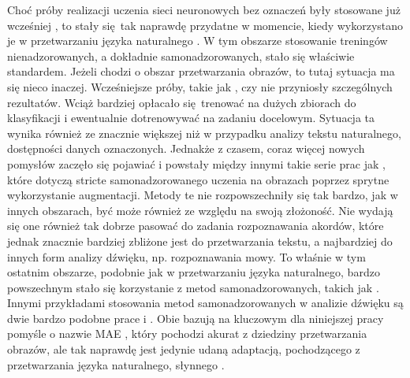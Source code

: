 Choć próby realizacji uczenia sieci neuronowych bez oznaczeń były stosowane już wcześniej \cite{noroozi_unsupervised_2017}, to stały się tak naprawdę przydatne w momencie, kiedy wykorzystano je w przetwarzaniu języka naturalnego \cite{devlin_bert_2019}. W tym obszarze stosowanie treningów nienadzorowanych, a dokładnie samonadzorowanych, stało się właściwie standardem. Jeżeli chodzi o obszar przetwarzania obrazów, to tutaj sytuacja ma się nieco inaczej. Wcześniejsze próby, takie jak \cite{pathak_context_2016}, czy \cite{noroozi_unsupervised_2017} nie przyniosły szczególnych rezultatów. Wciąż bardziej opłacało się trenować na dużych zbiorach do klasyfikacji i ewentualnie dotrenowywać na zadaniu docelowym. Sytuacja ta wynika również ze znacznie większej niż w przypadku analizy tekstu naturalnego, dostępności danych oznaczonych. Jednakże z czasem, coraz więcej nowych pomysłów zaczęło się pojawiać i powstały między innymi takie serie prac jak \cite{chen_simple_2020, grill_bootstrap_2020, caron_unsupervised_2021, caron_emerging_2021}, które dotyczą stricte samonadzorowanego uczenia na obrazach poprzez sprytne wykorzystanie augmentacji. Metody te nie rozpowszechniły się tak bardzo, jak w innych obszarach, być może również ze względu na swoją złożoność. Nie wydają się one również tak dobrze pasować do zadania rozpoznawania akordów, które jednak znacznie bardziej zbliżone jest do przetwarzania tekstu, a najbardziej do innych form analizy dźwięku, np. rozpoznawania mowy. To właśnie w tym ostatnim obszarze, podobnie jak w przetwarzaniu języka naturalnego, bardzo powszechnym stało się korzystanie z metod samonadzorowanych, takich jak \cite{baevski_wav2vec_2020}. Innymi przykładami stosowania metod samonadzorowanych w analizie dźwięku są dwie bardzo podobne prace \cite{baade_mae-ast_2022} i \cite{he_masked_2021}. Obie bazują na kluczowym dla niniejszej pracy pomyśle o nazwie MAE \cite{he_masked_2021}, który pochodzi akurat z dziedziny przetwarzania obrazów, ale tak naprawdę jest jedynie udaną adaptacją, pochodzącego z przetwarzania języka naturalnego, słynnego \cite{devlin_bert_2019}.

